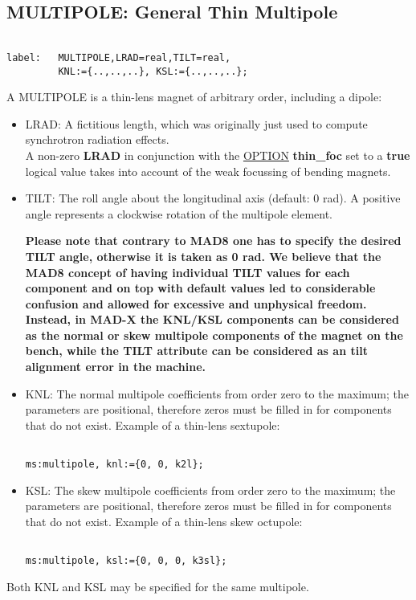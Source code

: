 





\subsection{MULTIPOLE: General Thin Multipole}
\begin{verbatim}

label:   MULTIPOLE,LRAD=real,TILT=real,
         KNL:={..,..,..}, KSL:={..,..,..};
\end{verbatim} A MULTIPOLE is a thin-lens magnet of arbitrary order, including a dipole: 
\begin{itemize}
	\item LRAD: A fictitious length, which was originally just used to compute synchrotron radiation effects.
\\ A non-zero \textbf{ LRAD } in conjunction  with the \href{../control/general.html#option}{OPTION}\textbf{ thin\_foc } set to a \textbf{ true } logical value takes into account of the weak focussing of bending magnets. 
	\item TILT: The roll angle about the longitudinal axis (default: 0 rad). A positive angle represents a clockwise rotation of the multipole element.  

\textbf{  Please note that contrary to MAD8 one has to specify the desired TILT angle, otherwise it is taken as 0 rad. We believe that the MAD8 concept of having individual TILT values for each component and on top with default values led to considerable confusion and allowed for excessive and unphysical freedom. Instead, in MAD-X the KNL/KSL components can be considered as the normal or skew multipole components of the magnet on the bench, while the TILT attribute can be considered as an tilt alignment error in the machine. }
	\item KNL: The normal multipole coefficients from order zero to the maximum; the parameters are positional, therefore zeros must be filled in for components that do not exist. Example of a thin-lens sextupole: 
\begin{verbatim}

ms:multipole, knl:={0, 0, k2l};
\end{verbatim}
	\item KSL: The skew multipole coefficients from order zero to the maximum; the parameters are positional, therefore zeros must be filled in for components that do not exist. Example of a thin-lens skew octupole: 
\begin{verbatim}

ms:multipole, ksl:={0, 0, 0, k3sl};
\end{verbatim}
\end{itemize} Both KNL and KSL may be specified for the same multipole. 

